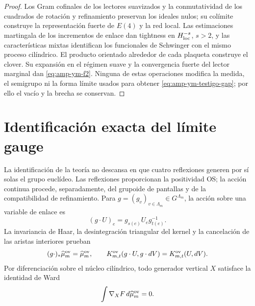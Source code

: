 \begin{proof}
Los Gram cofinales de los lectores suavizados y la conmutatividad de los
cuadrados de rotación y refinamiento preservan los ideales nulos; su
colímite construye la representación fuerte de \(E(4)\) y la red local.
Las estimaciones martingala de los incrementos de enlace dan tightness en
\(H^{-s}_{\rm loc}\), \(s>2\), y las características mixtas identifican los
funcionales de Schwinger con el mismo proceso cilíndrico. El producto
orientado alrededor de cada plaqueta construye el clover. Su expansión en
el régimen suave y la convergencia fuerte del lector marginal dan
\eqref{eq:amp-ym-f2}. Ninguna de estas operaciones modifica la medida, el
semigrupo ni la forma límite usados para obtener
\eqref{eq:amp-ym-testigo-gap}; por ello el vacío y la brecha se conservan.
\end{proof}

\section*{Identificación exacta del límite gauge}

La identificación de la teoría no descansa en que cuatro reflexiones
generen por sí solas el grupo euclídeo.  Las reflexiones proporcionan la
positividad OS; la acción continua procede, separadamente, del grupoide de
pantallas y de la compatibilidad de refinamiento.  Para
\(g=(g_v)_{v\in\Lambda_m}\in G^{\Lambda_m}\), la acción sobre una variable
de enlace es
\begin{equation}\label{eq:amp-ym-accion-gauge-enlace}
 (g\cdot U)_e=g_{s(e)}U_e g_{t(e)}^{-1}.
\end{equation}
La invariancia de Haar, la desintegración triangular del kernel y la
cancelación de las aristas interiores prueban
\begin{equation}\label{eq:amp-ym-invariancia-gauge-medida}
 (g\cdot)_*\widehat\mu_m^{\rm ov}=\widehat\mu_m^{\rm ov},
 \qquad
 K_{m,t}^{\rm ov}(g\cdot U,g\cdot dV)
 =K_{m,t}^{\rm ov}(U,dV).
\end{equation}
Por diferenciación sobre el núcleo cilíndrico, todo generador vertical
\(X\) satisface la identidad de Ward
\begin{equation}\label{eq:amp-ym-ward}
 \int \nabla_XF\,d\widehat\mu_m^{\rm ov}=0.
\end{equation}

